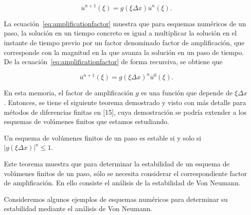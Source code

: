 \begin{equation}\label{eq:amplificationfactor}
  \overline{u}^{n+1}
  \left(\xi\right)=
  g
  \left(\xi\Delta x\right)
  \overline{u}^{n}
  \left(\xi\right).
\end{equation}

La ecuación~\eqref{eq:amplificationfactor} muestra que para esquemas
numéricos de un paso, la solución en un tiempo concreto es igual a
multiplicar la solución en el instante de tiempo previo por un factor
denominado factor de amplificación, que corresponde con la magnitud
en la que avanza la solución en un paso de tiempo.
De la ecuación~\eqref{eq:amplificationfactor} de forma recursiva, se
obtiene que

\begin{equation*}
  \overline{u}^{n+1}
  \left(\xi\right)=
  {g\left(\xi\Delta x\right)}^{n}
  \overline{u}^{0}
  \left(\xi\right).
\end{equation*}

En esta memoria, el factor de amplificación $g$ es una función que
depende de $\xi\Delta x$.
Entonces, se tiene el siguiente teorema demostrado y visto con más
detalle para métodos de diferencias finitas en [15], cuya demostración
se podría extender a los esquemas de volúmenes finitos que estamos
estudiando.

\begin{theorem}
  Un esquema de volúmenes finitos de un paso es estable si y solo si
  \begin{math}
    {\left|
    {g\left(\xi\Delta x\right)}
    \right|}^{n}\leq
    1
  \end{math}.
\end{theorem}

Este teorema muestra que para determinar la estabilidad de un esquema
de volúmenes finitos de un paso, sólo se necesita considerar el
correspondiente factor de amplificación.
En ello consiste el análisis de la estabilidad de Von Neumann.

Consideremos algunos ejemplos de esquemas numéricos para determinar
su estabilidad mediante el análisis de Von Neumann.

